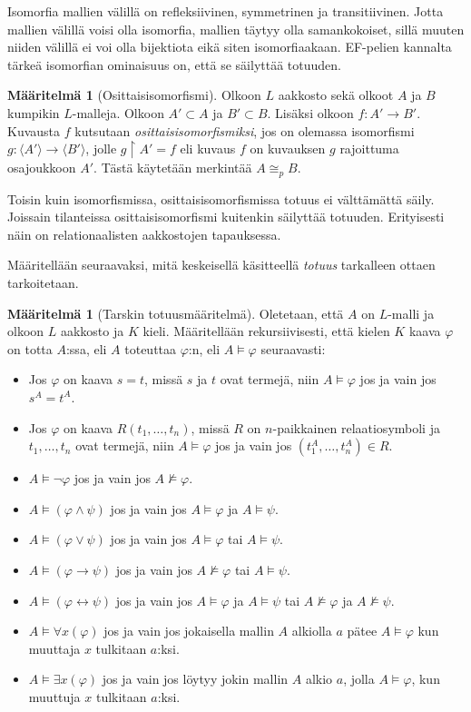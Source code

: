 \documentclass[finnish]{tktltiki2}
\theoremstyle{definition}
\newtheorem{maar}[lau]{Määritelmä}
\theoremstyle{remark}
\begin{document}
Isomorfia mallien välillä on refleksiivinen, symmetrinen ja transitiivinen. Jotta mallien välillä voisi olla isomorfia, mallien täytyy olla samankokoiset, sillä muuten niiden välillä ei voi olla bijektiota eikä siten isomorfiaakaan. EF-pelien kannalta tärkeä isomorfian ominaisuus on, että se säilyttää totuuden.

\begin{maar}[Osittaisisomorfismi]
Olkoon $L$ aakkosto sekä olkoot $A$ ja $B$ kumpikin $L$-malleja. Olkoon $A' \subset A$ ja $B' \subset B$. Lisäksi olkoon $f: A' \rightarrow B'$. Kuvausta $f$ kutsutaan \textit{osittaisisomorfismiksi}, jos on olemassa isomorfismi $g: \langle A' \rangle \rightarrow \langle B' \rangle$, jolle $g \restriction A' = f$ eli kuvaus $f$ on kuvauksen $g$ rajoittuma osajoukkoon $A'$. Tästä käytetään merkintää $A \cong_p B$.
\end{maar}

Toisin kuin isomorfismissa, osittaisisomorfismissa totuus ei välttämättä säily. Joissain tilanteissa osittaisisomorfismi kuitenkin säilyttää totuuden. Erityisesti näin on relationaalisten aakkostojen tapauksessa.

Määritellään seuraavaksi, mitä keskeisellä käsitteellä \textit{totuus} tarkalleen ottaen tarkoitetaan.

\begin{maar}[Tarskin totuusmääritelmä]
Oletetaan, että $A$ on $L$-malli ja olkoon $L$ aakkosto ja $K$ kieli. Määritellään rekursiivisesti, että kielen $K$ kaava $\varphi$ on totta $A$:ssa, eli $A$ toteuttaa $\varphi$:n, eli $A \models \varphi$ seuraavasti:
\begin{itemize}
\item Jos $\varphi$ on kaava $s = t$, missä $s$ ja $t$ ovat termejä, niin $A \models \varphi$ jos ja vain jos $s^A = t^A$.
\item Jos $\varphi$ on kaava $R(t_1, \ldots, t_n)$, missä $R$ on $n$-paikkainen relaatiosymboli ja $t_1, \ldots, t_n$ ovat termejä, niin $A \models \varphi$ jos ja vain jos $(t_1^A, \ldots, t_n^A) \in R$.
\item $A \models \neg \varphi$ jos ja vain jos $A \not \models \varphi$.
\item $A \models (\varphi \land \psi)$ jos ja vain jos $A \models \varphi$ ja $A \models \psi$.
\item $A \models (\varphi \lor \psi)$ jos ja vain jos $A \models \varphi$ tai $A \models \psi$.
\item $A \models (\varphi \to \psi)$ jos ja vain jos $A \not \models \varphi$ tai $A \models \psi$.
\item $A \models (\varphi \leftrightarrow \psi)$ jos ja vain jos $A \models \varphi$ ja $A \models \psi$ tai $A \not \models \varphi$ ja $A \not \models \psi$.
\item $A \models \forall x(\varphi)$ jos ja vain jos jokaisella mallin $A$ alkiolla $a
$ pätee $A \models \varphi$ kun muuttaja $x$ tulkitaan $a$:ksi.
\item $A \models \exists x(\varphi)$ jos ja vain jos löytyy jokin mallin $A$ alkio $a$, jolla $A \models \varphi$, kun muuttuja $x$ tulkitaan $a$:ksi.
\end{itemize}
\end{maar}
\end{document}

